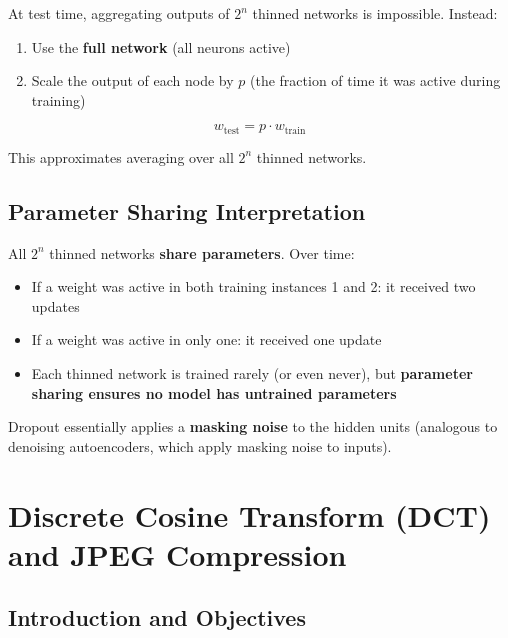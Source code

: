 \documentclass[12pt,a4paper]{article}
\begin{document}
At test time, aggregating outputs of $2^n$ thinned networks is impossible. Instead:
\begin{enumerate}
  \item Use the \textbf{full network} (all neurons active)
  \item Scale the output of each node by $p$ (the fraction of time it was active during training)
\end{enumerate}

\[
  w_{\text{test}} = p \cdot w_{\text{train}}
\]

This approximates averaging over all $2^n$ thinned networks.

\subsection{Parameter Sharing Interpretation}

All $2^n$ thinned networks \textbf{share parameters}. Over time:
\begin{itemize}
  \item If a weight was active in both training instances 1 and 2: it received two updates
  \item If a weight was active in only one: it received one update
  \item Each thinned network is trained rarely (or even never), but \textbf{parameter sharing ensures no model has untrained parameters}
\end{itemize}

\begin{notebox}
Dropout essentially applies a \textbf{masking noise} to the hidden units (analogous to denoising autoencoders, which apply masking noise to inputs).
\end{notebox}

\section{Discrete Cosine Transform (DCT) and JPEG Compression}

\subsection{Introduction and Objectives}
\end{document}
